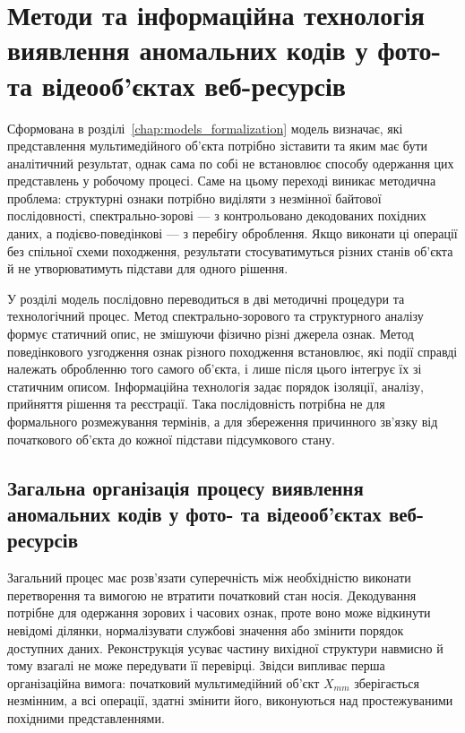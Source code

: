 \chapter{Методи та інформаційна технологія виявлення аномальних кодів у фото- та відеооб’єктах веб-ресурсів}
\label{chap:methods_technology}

Сформована в розділі~\ref{chap:models_formalization} модель визначає, які представлення мультимедійного об’єкта потрібно зіставити та яким має бути аналітичний результат, однак сама по собі не встановлює способу одержання цих представлень у робочому процесі. Саме на цьому переході виникає методична проблема: структурні ознаки потрібно виділяти з незмінної байтової послідовності, спектрально-зорові --- з контрольовано декодованих похідних даних, а подієво-поведінкові --- з перебігу оброблення. Якщо виконати ці операції без спільної схеми походження, результати стосуватимуться різних станів об’єкта й не утворюватимуть підстави для одного рішення.

У розділі модель послідовно переводиться в дві методичні процедури та технологічний процес. Метод спектрально-зорового та структурного аналізу формує статичний опис, не змішуючи фізично різні джерела ознак. Метод поведінкового узгодження ознак різного походження встановлює, які події справді належать обробленню того самого об’єкта, і лише після цього інтегрує їх зі статичним описом. Інформаційна технологія задає порядок ізоляції, аналізу, прийняття рішення та реєстрації. Така послідовність потрібна не для формального розмежування термінів, а для збереження причинного зв’язку від початкового об’єкта до кожної підстави підсумкового стану.

\section{Загальна організація процесу виявлення аномальних кодів у фото- та відеооб’єктах веб-ресурсів}
\label{sec:process_organization}

Загальний процес має розв’язати суперечність між необхідністю виконати перетворення та вимогою не втратити початковий стан носія. Декодування потрібне для одержання зорових і часових ознак, проте воно може відкинути невідомі ділянки, нормалізувати службові значення або змінити порядок доступних даних. Реконструкція усуває частину вихідної структури навмисно й тому взагалі не може передувати її перевірці. Звідси випливає перша організаційна вимога: початковий мультимедійний об’єкт $X_{mm}$ зберігається незмінним, а всі операції, здатні змінити його, виконуються над простежуваними похідними представленнями.

